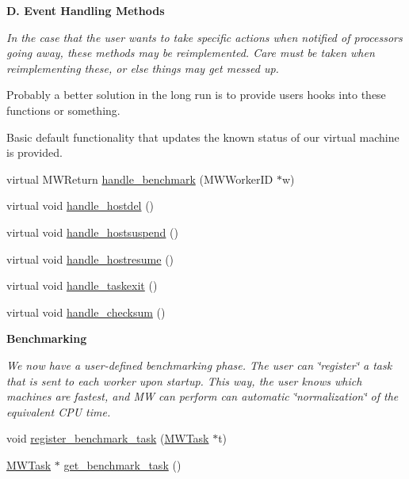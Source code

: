 \begin{Indent}\textbf{ D. Event Handling Methods}\par
{\em In the case that the user wants to take specific actions when notified of processors going away, these methods may be reimplemented. Care must be taken when reimplementing these, or else things may get messed up.

Probably a better solution in the long run is to provide users hooks into these functions or something.

Basic default functionality that updates the known status of our virtual machine is provided. }\begin{DoxyCompactItemize}
\item 
virtual M\+W\+Return \hyperlink{classMWDriver_a73290f6fab539708112ec28a9e49b563}{handle\+\_\+benchmark} (M\+W\+Worker\+ID $\ast$w)
\item 
virtual void \hyperlink{classMWDriver_af6c437b207bd8d327ceb84c5ce0c4304}{handle\+\_\+hostdel} ()
\item 
virtual void \hyperlink{classMWDriver_a91c21e0a4aba8ce4e03ebf7c3064f6b5}{handle\+\_\+hostsuspend} ()
\item 
virtual void \hyperlink{classMWDriver_a0e1ef56017457e099e5947e81dd5d761}{handle\+\_\+hostresume} ()
\item 
virtual void \hyperlink{classMWDriver_ab4ee1fc1cbc9f5e07e3083f499d29be0}{handle\+\_\+taskexit} ()
\item 
virtual void \hyperlink{classMWDriver_a7b1d0f044688941bd9a0e502b48c4676}{handle\+\_\+checksum} ()
\end{DoxyCompactItemize}
\end{Indent}
\begin{Indent}\textbf{ Benchmarking}\par
{\em We now have a user-\/defined benchmarking phase. The user can \char`\"{}register\char`\"{} a task that is sent to each worker upon startup. This way, the user knows which machines are fastest, and MW can perform can automatic \char`\"{}normalization\char`\"{} of the equivalent C\+PU time. }\begin{DoxyCompactItemize}
\item 
void \hyperlink{classMWDriver_ad0a6b24ff90e2d2ae1495062fb480f24}{register\+\_\+benchmark\+\_\+task} (\hyperlink{classMWTask}{M\+W\+Task} $\ast$t)
\item 
\hyperlink{classMWTask}{M\+W\+Task} $\ast$ \hyperlink{classMWDriver_a77e388c0446e7c42a8c6d0ee544a29b6}{get\+\_\+benchmark\+\_\+task} ()
\end{DoxyCompactItemize}
\end{Indent}

